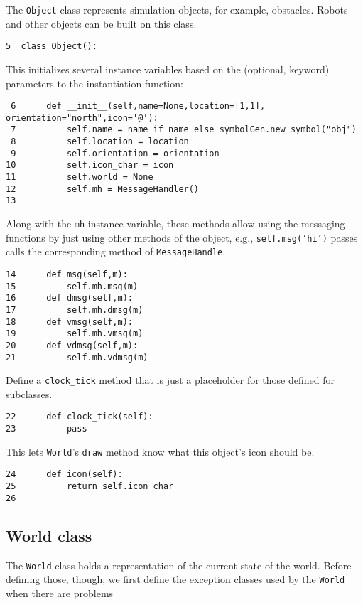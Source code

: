 \documentclass[11pt]{tufte-handout}
\begin{document}
The \texttt{Object} class represents simulation objects, for example, obstacles.  Robots and other objects can be built on this class.


\begin{verbatim}
5  class Object():
\end{verbatim}

This initializes several instance variables based on the (optional, keyword) parameters to the instantiation function:

\begin{verbatim}
 6      def __init__(self,name=None,location=[1,1], orientation="north",icon='@'):
 7          self.name = name if name else symbolGen.new_symbol("obj")
 8          self.location = location
 9          self.orientation = orientation
10          self.icon_char = icon
11          self.world = None
12          self.mh = MessageHandler()
13  
\end{verbatim}

Along with the \texttt{mh} instance variable, these methods allow using the messaging functions by just using other methods of the object, e.g., \texttt{self.msg('hi')} passes calls the corresponding method of \texttt{MessageHandle}.

\begin{verbatim}
14      def msg(self,m):
15          self.mh.msg(m)
16      def dmsg(self,m):
17          self.mh.dmsg(m)
18      def vmsg(self,m):
19          self.mh.vmsg(m)
20      def vdmsg(self,m):
21          self.mh.vdmsg(m)
\end{verbatim}

Define a \texttt{clock\_tick} method that is just a placeholder for those defined for subclasses.

\begin{verbatim}
22      def clock_tick(self):
23          pass
\end{verbatim}

This lets \texttt{World}'s \texttt{draw} method know what this object's icon should be.

\begin{verbatim}
24      def icon(self):
25          return self.icon_char
26  
\end{verbatim}

\subsection{World class}
\label{sec:org88d642a}

The \texttt{World} class holds a representation of the current state of the world.  Before defining those, though, we first define the exception classes used by the \texttt{World} when there are problems
\end{document}

